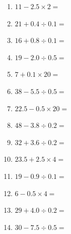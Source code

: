 \documentclass[12pt]{article}
\begin{document}
\begin{enumerate}
\item \large $ 11 - 2.5 \times 2 = $ \vspace{1.6cm}
\item \large $ 21 + 0.4 \div 0.1 = $ \vspace{1.6cm}
\item \large $ 16 + 0.8 \div 0.1 = $ \vspace{1.6cm}
\item \large $ 19 - 2.0 \div 0.5 = $ \vspace{1.6cm}
\newpage
\item \large $ 7 + 0.1 \times 20 = $ \vspace{1.6cm}
\item \large $ 38 - 5.5 \div 0.5 = $ \vspace{1.6cm}
\item \large $ 22.5 - 0.5 \times 20 = $ \vspace{1.6cm}
\item \large $ 48 - 3.8 \div 0.2 = $ \vspace{1.6cm}
\item \large $ 32 + 3.6 \div 0.2 = $ \vspace{1.6cm}
\item \large $ 23.5 + 2.5 \times 4 = $ \vspace{1.6cm}
\item \large $ 19 - 0.9 \div 0.1 = $ \vspace{1.6cm}
\item \large $ 6 - 0.5 \times 4 = $ \vspace{1.6cm}
\item \large $ 29 + 4.0 \div 0.2 = $ \vspace{1.6cm}
\item \large $ 30 - 7.5 \div 0.5 = $ \vspace{1.6cm}
\end{enumerate}
\newpage
\end{document}
